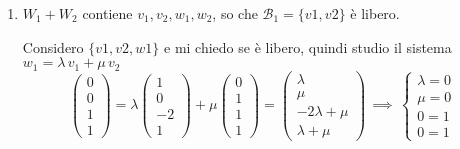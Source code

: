{\begin{enumerate}
        $\implies$ $W_1= \mathscr{L}\left((1, 0, -2, 1), (0, 1, 1, 1)\right)$, ma i due generatori sono linearmente indipendenti 
        
        $\implies$ $ \mathscr{B}_1=\{(1,0,-2,1),(0,1,1,1)\}$ base di $ W_1 $, con $v_1=(1,0,-2,1)$ e $v_2=(0,1,1,1)$
    
        Per $ W_2 $ si osserva che \[(2, 2, -2, -2)=-2(0,0, 1, 1)+2(1, 1, 0, 0)\] 
        
        $\implies$ $W_2= \mathscr{L}\left((0,0,1,1), (1, 1, 0, 0)\right)$. 
        
        Poiché i due generatori sono linearmente indipendenti 
        
        $\implies$ $ \mathscr{B}_2=\{(0,0,1,1),(1,1,0,0)\}$ base di $ W_2 $, con $w_1=(0,0,1,1)$ e $w_2=(1,1,0,0)$.
        \item $W_1+W_2$ contiene $v_1, v_2, w_1, w_2$, so che $ \mathscr{B}_1=\{v1,v2\}$ è libero. 
        
        Considero $\{v1, v2, w1\}$ e mi chiedo se è libero, quindi studio il sistema $w_1=\lambda\, v_1 + \mu\, v_2$
        \[
            \begin{pmatrix}
                0\\ 0\\ 1\\ 1
            \end{pmatrix} = \lambda \begin{pmatrix}
                1\\ 0\\ -2\\ 1
            \end{pmatrix} + \mu \begin{pmatrix}
                0\\ 1\\ 1\\ 1 
            \end{pmatrix}= \begin{pmatrix}
                \lambda \\ \mu\\ -2\lambda + \mu\\ \lambda+\mu
            \end{pmatrix} \,\implies\, \begin{cases}
                \lambda=0\\
        \mu=0\\
        0=1\\
        0=1
            \end{cases}
        \] 
        

\end{enumerate}}
